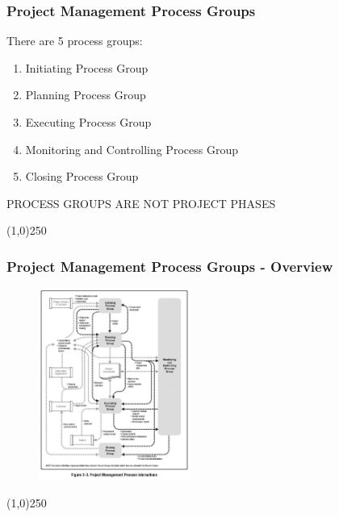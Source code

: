 \begin{frame}
\frametitle{Project Management Process Groups}
There are 5 process groups:
\begin{enumerate}
	\item Initiating Process Group
	\item Planning Process Group
	\item Executing Process Group
	\item Monitoring and Controlling Process Group
	\item Closing Process Group
\end{enumerate}
PROCESS GROUPS ARE NOT PROJECT PHASES\\
\end{frame}
\begin{center}\line(1,0){250}\end{center}



\begin{frame}
\frametitle{Project Management Process Groups - Overview}
 \begin{figure}
 	\centering
 		\includegraphics[width = 5cm]{images/Fig3-3.jpg}
 	\label{fig:3-3}
 \end{figure}
\end{frame}
\begin{center}\line(1,0){250}\end{center}



